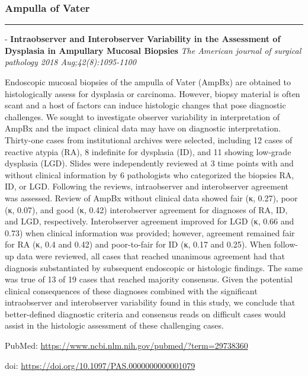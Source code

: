 \documentclass[]{article}
\begin{document}
\hypertarget{ampulla-of-vater}{%
\subsubsection{Ampulla of Vater}\label{ampulla-of-vater}}

\begin{center}\rule{0.5\linewidth}{\linethickness}\end{center}

 - \textbf{Intraobserver and Interobserver Variability in the Assessment
of Dysplasia in Ampullary Mucosal Biopsies} \emph{The American journal
of surgical pathology 2018 Aug;42(8):1095-1100}

Endoscopic mucosal biopsies of the ampulla of Vater (AmpBx) are obtained
to histologically assess for dysplasia or carcinoma. However, biopsy
material is often scant and a host of factors can induce histologic
changes that pose diagnostic challenges. We sought to investigate
observer variability in interpretation of AmpBx and the impact clinical
data may have on diagnostic interpretation. Thirty-one cases from
institutional archives were selected, including 12 cases of reactive
atypia (RA), 8 indefinite for dysplasia (ID), and 11 showing low-grade
dysplasia (LGD). Slides were independently reviewed at 3 time points
with and without clinical information by 6 pathologists who categorized
the biopsies RA, ID, or LGD. Following the reviews, intraobserver and
interobserver agreement was assessed. Review of AmpBx without clinical
data showed fair (κ, 0.27), poor (κ, 0.07), and good (κ, 0.42)
interobserver agreement for diagnoses of RA, ID, and LGD, respectively.
Interobserver agreement improved for LGD (κ, 0.66 and 0.73) when
clinical information was provided; however, agreement remained fair for
RA (κ, 0.4 and 0.42) and poor-to-fair for ID (κ, 0.17 and 0.25). When
follow-up data were reviewed, all cases that reached unanimous agreement
had that diagnosis substantiated by subsequent endoscopic or histologic
findings. The same was true of 13 of 19 cases that reached majority
consensus. Given the potential clinical consequences of these diagnoses
combined with the significant intraobserver and interobserver
variability found in this study, we conclude that better-defined
diagnostic criteria and consensus reads on difficult cases would assist
in the histologic assessment of these challenging cases.

PubMed: \url{https://www.ncbi.nlm.nih.gov/pubmed/?term=29738360}

doi: \url{https://doi.org/10.1097/PAS.0000000000001079}
\end{document}
